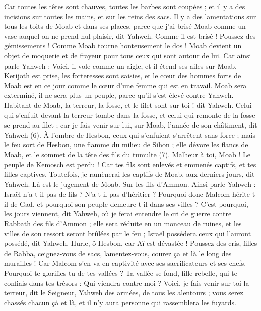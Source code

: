 \begin{multicols}{2}
Car toutes les têtes sont chauves, toutes les barbes sont coupées ; et il y a des incisions sur toutes les mains, et sur les reins des sacs.
Il y a des lamentations sur tous les toits de Moab et dans ses places, parce que j'ai brisé Moab comme un vase auquel on ne prend nul plaisir, dit Yahweh.
Comme il est brisé ! Poussez des gémissements ! Comme Moab tourne honteusement le dos ! Moab devient un objet de moquerie et de frayeur pour tous ceux qui sont autour de lui.
Car ainsi parle Yahweh : Voici, il vole comme un aigle, et il étend ses ailes sur Moab.
Kerijoth est prise, les forteresses sont saisies, et le cœur des hommes forts de Moab est en ce jour comme le cœur d'une femme qui est en travail.
Moab sera exterminé, il ne sera plus un peuple, parce qu'il s'est élevé contre Yahweh.
Habitant de Moab, la terreur, la fosse, et le filet sont sur toi ! dit Yahweh.
Celui qui s'enfuit devant la terreur tombe dans la fosse, et celui qui remonte de la fosse se prend au filet ; car je fais venir sur lui, sur Moab, l'année de son châtiment, dit Yahweh\FTNT{} (6).
À l'ombre de Hesbon, ceux qui s'enfuient s'arrêtent sans force ; mais le feu sort de Hesbon, une flamme du milieu de Sihon ; elle dévore les flancs de Moab, et le sommet de la tête des fils du tumulte\FTNT{} (7).
Malheur à toi, Moab ! Le peuple de Kemosch est perdu ! Car tes fils sont enlevés et emmenés captifs, et tes filles captives.
Toutefois, je ramènerai les captifs de Moab, aux derniers jours, dit Yahweh. Là est le jugement de Moab.
\VerseOne{}Sur les fils d'Ammon. Ainsi parle Yahweh : Israël n'a-t-il pas de fils ? N'a-t-il pas d'héritier ? Pourquoi donc Malcom hérite-t-il de Gad, et pourquoi son peuple demeure-t-il dans ses villes ?
C'est pourquoi, les jours viennent, dit Yahweh, où je ferai entendre le cri de guerre contre Rabbath des fils d'Ammon ; elle sera réduite en un monceau de ruines, et les villes de son ressort seront brûlées par le feu ; Israël possédera ceux qui l'auront possédé, dit Yahweh.
Hurle, ô Hesbon, car Aï est dévastée ! Poussez des cris, filles de Rabba, ceignez-vous de sacs, lamentez-vous, courez ça et là le long des murailles ! Car Malcom s'en va en captivité avec ses sacrificateurs et ses chefs.
Pourquoi te glorifies-tu de tes vallées ? Ta vallée se fond, fille rebelle, qui te confiais dans tes trésors : Qui viendra contre moi ?
Voici, je fais venir sur toi la terreur, dit le Seigneur, Yahweh des armées, de tous les alentours ; vous serez chassés chacun çà et là, et il n'y aura personne qui rassemblera les fuyards.

\end{multicols}
